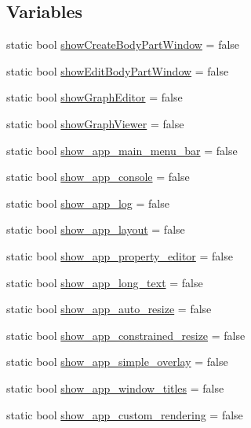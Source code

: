 \subsection*{Variables}
\begin{DoxyCompactItemize}
\item 
static bool \mbox{\hyperlink{namespace_main_debug_window_aecac45aa381a26437f3519dd9cf1b403}{show\+Create\+Body\+Part\+Window}} = false
\item 
static bool \mbox{\hyperlink{namespace_main_debug_window_a90df404ec0b23cb2c80cc587cfede8d5}{show\+Edit\+Body\+Part\+Window}} = false
\item 
static bool \mbox{\hyperlink{namespace_main_debug_window_af54b4667d3cb7d0fb05ce6c9535c84f9}{show\+Graph\+Editor}} = false
\item 
static bool \mbox{\hyperlink{namespace_main_debug_window_a7506661f3b38a06ffb139558cc13db17}{show\+Graph\+Viewer}} = false
\item 
static bool \mbox{\hyperlink{namespace_main_debug_window_aa4032988a3f2666cda099ff84d7ab8cf}{show\+\_\+app\+\_\+main\+\_\+menu\+\_\+bar}} = false
\item 
static bool \mbox{\hyperlink{namespace_main_debug_window_a048b3be9ac7bf23eefd52cbc77a92596}{show\+\_\+app\+\_\+console}} = false
\item 
static bool \mbox{\hyperlink{namespace_main_debug_window_ab170e57882bad8474b5fc845ae2cdc4e}{show\+\_\+app\+\_\+log}} = false
\item 
static bool \mbox{\hyperlink{namespace_main_debug_window_adbaab75ad811876160fda4ab3596573e}{show\+\_\+app\+\_\+layout}} = false
\item 
static bool \mbox{\hyperlink{namespace_main_debug_window_ade57a732fb881ed8ab3cb01fb23396f4}{show\+\_\+app\+\_\+property\+\_\+editor}} = false
\item 
static bool \mbox{\hyperlink{namespace_main_debug_window_ae6740028c74b7452ab16514085a2dbbb}{show\+\_\+app\+\_\+long\+\_\+text}} = false
\item 
static bool \mbox{\hyperlink{namespace_main_debug_window_a571293b8a36266e08a7b589e34e4a0cc}{show\+\_\+app\+\_\+auto\+\_\+resize}} = false
\item 
static bool \mbox{\hyperlink{namespace_main_debug_window_a3951c4eed8652c05996a489be6ad1182}{show\+\_\+app\+\_\+constrained\+\_\+resize}} = false
\item 
static bool \mbox{\hyperlink{namespace_main_debug_window_a261fda245d1a8da3e0a01e92025ccf1c}{show\+\_\+app\+\_\+simple\+\_\+overlay}} = false
\item 
static bool \mbox{\hyperlink{namespace_main_debug_window_adaa1186c90fa5182be3e7b8e2bd763d4}{show\+\_\+app\+\_\+window\+\_\+titles}} = false
\item 
static bool \mbox{\hyperlink{namespace_main_debug_window_a07e7a21c7e9392ff4ee8e8140bdc20de}{show\+\_\+app\+\_\+custom\+\_\+rendering}} = false
\end{DoxyCompactItemize}


